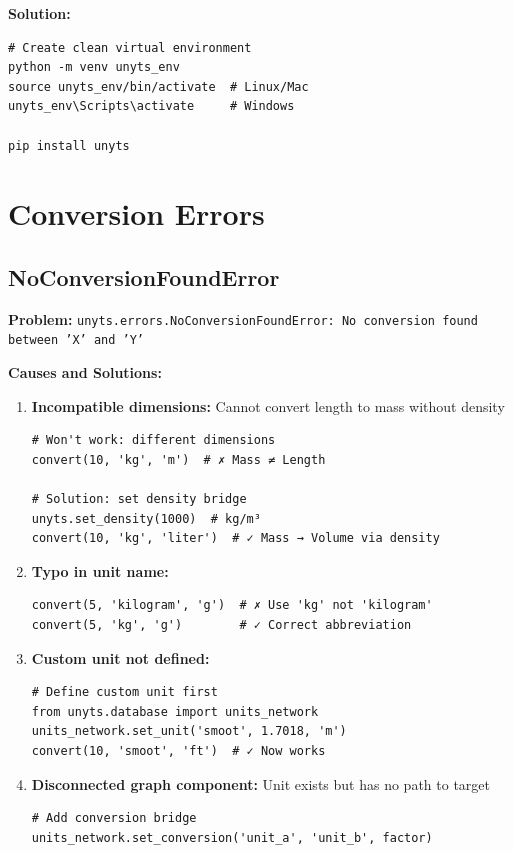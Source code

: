 \documentclass[11pt,a4paper]{report}
\begin{document}
\textbf{Solution:}
\begin{lstlisting}[style=pythonstyle]
# Create clean virtual environment
python -m venv unyts_env
source unyts_env/bin/activate  # Linux/Mac
unyts_env\Scripts\activate     # Windows

pip install unyts
\end{lstlisting}

\section{Conversion Errors}

\subsection{NoConversionFoundError}

\textbf{Problem:} \texttt{unyts.errors.NoConversionFoundError: No conversion found between 'X' and 'Y'}

\textbf{Causes and Solutions:}

\begin{enumerate}
\item \textbf{Incompatible dimensions:} Cannot convert length to mass without density
\begin{lstlisting}[style=pythonstyle]
# Won't work: different dimensions
convert(10, 'kg', 'm')  # ✗ Mass ≠ Length

# Solution: set density bridge
unyts.set_density(1000)  # kg/m³
convert(10, 'kg', 'liter')  # ✓ Mass → Volume via density
\end{lstlisting}

\item \textbf{Typo in unit name:}
\begin{lstlisting}[style=pythonstyle]
convert(5, 'kilogram', 'g')  # ✗ Use 'kg' not 'kilogram'
convert(5, 'kg', 'g')        # ✓ Correct abbreviation
\end{lstlisting}

\item \textbf{Custom unit not defined:}
\begin{lstlisting}[style=pythonstyle]
# Define custom unit first
from unyts.database import units_network
units_network.set_unit('smoot', 1.7018, 'm')
convert(10, 'smoot', 'ft')  # ✓ Now works
\end{lstlisting}

\item \textbf{Disconnected graph component:} Unit exists but has no path to target
\begin{lstlisting}[style=pythonstyle]
# Add conversion bridge
units_network.set_conversion('unit_a', 'unit_b', factor)
\end{lstlisting}
\end{enumerate}
\end{document}
